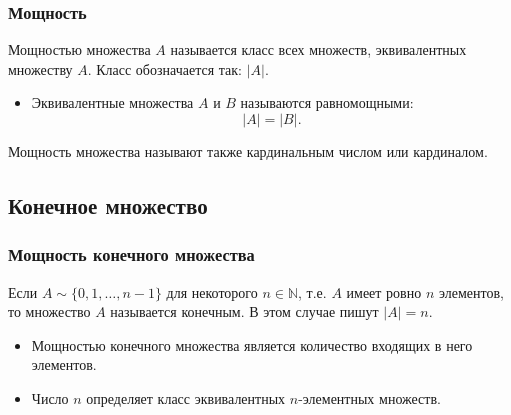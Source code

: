 \begin{frame}
    \frametitle{Мощность}
    
    \begin{definition}
        \alert{Мощностью} множества $A$ называется класс всех множеств, эквивалентных множеству $A$. Класс обозначается так: $|A|$.
    \end{definition}
    
    \begin{itemize}
        \item Эквивалентные множества $A$ и $B$ называются \alert{равномощными}: 
        \[|A|=|B|.\]
    \end{itemize}
    
    \begin{definition}
        Мощность множества называют также \alert{кардинальным числом} или \alert{кардиналом}.
    \end{definition}
\end{frame}


\subsection{Конечное множество}

\begin{frame}
    \frametitle{Мощность конечного множества}
    
    \begin{definition}
        Если $A\sim \{0,1,\ldots,n-1\}$ для некоторого $n\in\mathbb{N}$, т.е. $A$ имеет ровно $n$ элементов, то множество $A$ называется \alert{конечным}. В этом случае пишут $|A|=n$.
    \end{definition}
    
    \begin{itemize}
        \item Мощностью \alert{конечного} множества является количество входящих в него элементов. 
    
        \item Число $n$ определяет \alert{класс} эквивалентных $n$-элементных множеств.
    \end{itemize}
\end{frame}

